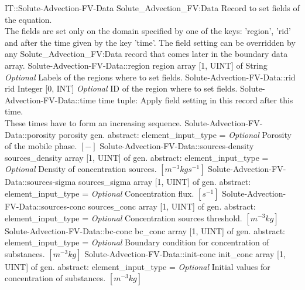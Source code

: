 \begin{RecordType}
	{IT::Solute-Advection-FV-Data}
	{Solute{\_}Advection{\_}FV:Data}
	{}%
	{}%
	{{{Record to set fields of the equation.}\\{
The fields are set only on the domain specified by one of the keys: 'region', 'rid'}\\{
and after the time given by the key 'time'. The field setting can be overridden by}\\{
 any Solute{\_}Advection{\_}FV:Data record that comes later in the boundary data array.}%
}}
		\RecKey
			{Solute-Advection-FV-Data::region}
			{region}
			{{array [1, UINT] of }{String}}{}
			{ \it{Optional}}
			{{{Labels of the regions where to set fields. }%
}}
		\RecKey
			{Solute-Advection-FV-Data::rid}
			{rid}
			{{Integer [0, INT]}}{}
			{ \it{Optional}}
			{{{ID of the region where to set fields.}%
}}
		\RecKey
			{Solute-Advection-FV-Data::time}
			{time}
			{{tuple: }}{}
			{ }
			{{{Apply field setting in this record after this time.}\\{
These times have to form an increasing sequence.}%
}}
		\RecKey
			{Solute-Advection-FV-Data::porosity}
			{porosity}
			{{gen. abstract: }}{{element{\_}input{\_}type}{ = }}
			{ \it{Optional}}
			{{{Porosity of the mobile phase. }{$[-]$}%
}}
		\RecKey
			{Solute-Advection-FV-Data::sources-density}
			{sources{\_}density}
			{{array [1, UINT] of }{gen. abstract: }}{{element{\_}input{\_}type}{ = }}
			{ \it{Optional}}
			{{{Density of concentration sources. }{$[m^{-3}kgs^{-1}]$}%
}}
		\RecKey
			{Solute-Advection-FV-Data::sources-sigma}
			{sources{\_}sigma}
			{{array [1, UINT] of }{gen. abstract: }}{{element{\_}input{\_}type}{ = }}
			{ \it{Optional}}
			{{{Concentration flux. }{$[s^{-1}]$}%
}}
		\RecKey
			{Solute-Advection-FV-Data::sources-conc}
			{sources{\_}conc}
			{{array [1, UINT] of }{gen. abstract: }}{{element{\_}input{\_}type}{ = }}
			{ \it{Optional}}
			{{{Concentration sources threshold. }{$[m^{-3}kg]$}%
}}
		\RecKey
			{Solute-Advection-FV-Data::bc-conc}
			{bc{\_}conc}
			{{array [1, UINT] of }{gen. abstract: }}{{element{\_}input{\_}type}{ = }}
			{ \it{Optional}}
			{{{Boundary condition for concentration of substances. }{$[m^{-3}kg]$}%
}}
		\RecKey
			{Solute-Advection-FV-Data::init-conc}
			{init{\_}conc}
			{{array [1, UINT] of }{gen. abstract: }}{{element{\_}input{\_}type}{ = }}
			{ \it{Optional}}
			{{{Initial values for concentration of substances. }{$[m^{-3}kg]$}%
}}
\end{RecordType}
